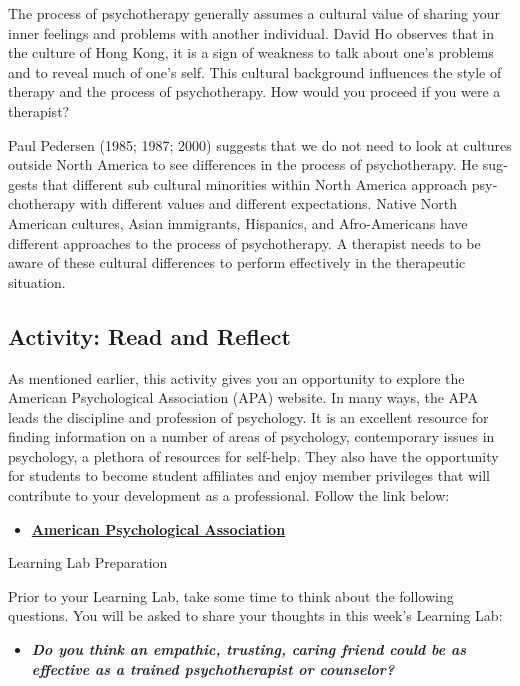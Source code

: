 \documentclass[
]{book}
\providecommand{\tightlist}{%
  \setlength{\itemsep}{0pt}\setlength{\parskip}{0pt}}
\begin{document}
The process of psychotherapy generally assumes a cultural value of sharing your inner feelings and problems with another individual. David Ho observes that in the culture of Hong Kong, it is a sign of weakness to talk about one's problems and to reveal much of one's self. This cultural background influences the style of therapy and the process of psychotherapy. How would you proceed if you were a therapist?

Paul Pedersen (1985; 1987; 2000) suggests that we do not need to look at cultures outside North America to see differences in the process of psychotherapy. He sug­gests that different sub cultural minorities within North America approach psy­chotherapy with different values and different expectations. Native North American cultures, Asian immigrants, Hispanics, and Afro-Americans have different approaches to the pro­cess of psychotherapy. A therapist needs to be aware of these cultural differ­ences to perform effectively in the therapeutic situation.

\hypertarget{activity-read-and-reflect-20}{%
\subsection*{Activity: Read and Reflect}\label{activity-read-and-reflect-20}}

\begin{reflect}
As mentioned earlier, this activity gives you an opportunity to explore the American Psychological Association (APA) website. In many ways, the APA leads the discipline and profession of psychology. It is an excellent resource for finding information on a number of areas of psychology, contemporary issues in psychology, a plethora of resources for self-help. They also have the opportunity for students to become student affiliates and enjoy member privileges that will contribute to your development as a professional. Follow the link below:

\begin{itemize}
\tightlist
\item
  \href{https://www.apa.org/}{\textbf{American Psychological Association}}
\end{itemize}

{Learning Lab Preparation}

Prior to your Learning Lab, take some time to think about the following questions. You will be asked to share your thoughts in this week's Learning Lab:

\begin{itemize}
\tightlist
\item
  \textbf{\emph{Do you think an empathic, trusting, caring friend could be as effective as a trained psychotherapist or counselor?}}
\end{itemize}
\end{reflect}
\end{document}
